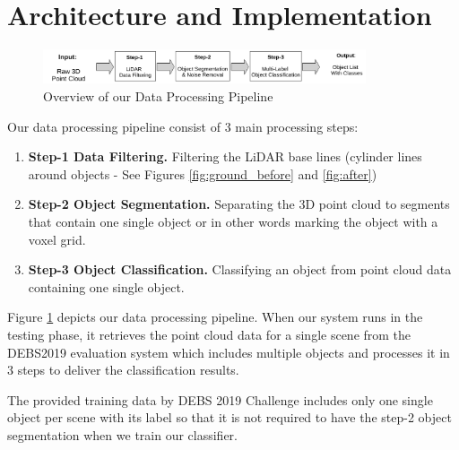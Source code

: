 \section{Architecture and Implementation}\label{sec:Architecture}

\begin{figure}[!ht]
 \begin{center}
   \includegraphics[width=0.85\textwidth]{./images/DataProcessingPipleline.pdf}
   \caption{Overview of our Data Processing Pipeline}
   \label{fig:dataPipeline}
 \end{center}
\end{figure}

Our data processing pipeline consist of 3 main processing steps:

\begin{enumerate}
  \item \textbf{Step-1 Data Filtering. } Filtering the LiDAR base lines (cylinder lines around objects - See Figures \ref{fig:ground_before} and \ref{fig:after})

  \item \textbf{Step-2 Object Segmentation.} Separating the 3D point cloud to segments that contain one single object or in other words marking the object with a voxel grid.

  \item \textbf{Step-3 Object Classification.}  Classifying an object from point cloud data containing one single object.
\end{enumerate}



Figure \ref{fig:dataPipeline} depicts our data processing pipeline.
When our system runs in the testing phase, it retrieves the point cloud data for a single scene
from the DEBS2019 evaluation system which includes multiple objects and processes it in 3 steps to
deliver the classification results.

The provided training data by DEBS 2019 Challenge \cite{DEBSGC2019} includes only one single object per scene
with its label so that it is not required to have the step-2 object segmentation when we train our classifier.


